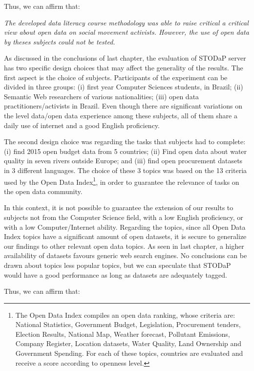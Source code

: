 Thus, we can affirm that:

\noindent \emph{The developed data literacy course methodology was able to raise critical a critical view about open data on social movement activists. However, the use of open data by theses subjects could not be tested.}

As discussed in the conclusions of last chapter, the evaluation of STODaP server has two specific design choices that may affect the generality of the results.
The first aspect is the choice of subjects.
Participants of the experiment can be divided in three groups: (i) first year Computer Sciences students, in Brazil; (ii) Semantic Web researchers of various nationalities; (iii) open data practitioners/activists in Brazil.
Even though there are significant variations on the level data/open data experience among these subjects, all of them share a daily use of internet and a good English proficiency.

The second design choice was regarding the tasks that subjects had to complete: (i) find 2015 open budget data from 5 countries; (ii) Find open data about water quality in seven rivers outside Europe; and (iii) find open procurement datasets in 3 different languages.
The choice of these 3 topics was based on the 13 criteria used by the Open Data Index\footnote{The Open Data Index compiles an open data ranking, whose criteria are: National Statistics, Government Budget, Legislation, Procurement tenders, Election Results, National Map, Weather forecast, Pollutant Emissions, Company Register, Location datasets, Water Quality, Land Ownership and Government Spending. For each of these topics, countries are evaluated and receive a score according to openness level.}, in order to guarantee the relevance of tasks on the open data community.

In this context, it is not possible to guarantee the extension of our results to subjects not from the Computer Science field, with a low English proficiency, or with a low Computer/Internet ability.
Regarding the topics, since all Open Data Index topics have a significant amount of open datasets, it is secure to generalize our findings to other relevant open data topics.
As seen in last chapter, a higher availability of datasets favours generic web search engines.
No conclusions can be drawn about topics less popular topics, but we can speculate that STODaP would have a good performance as long as datasets are adequately tagged.

Thus, we can affirm that:

